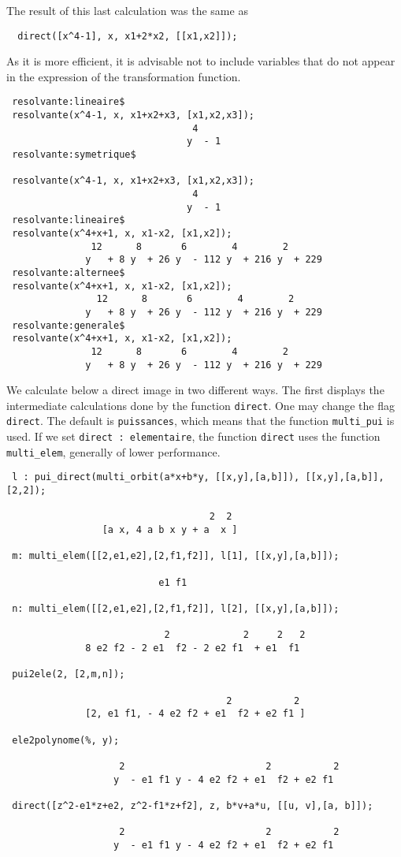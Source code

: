 \documentclass[11pt]{article}
\begin{document}
\normalsize
The result of this last calculation was the same as
\begin{verbatim} 
  direct([x^4-1], x, x1+2*x2, [[x1,x2]]);
\end{verbatim}
As it is more efficient, it is advisable not to include variables that do not
appear in the expression of the transformation function.
\small
\begin{verbatim} 
 resolvante:lineaire$
 resolvante(x^4-1, x, x1+x2+x3, [x1,x2,x3]);
                                 4
                                y  - 1
 resolvante:symetrique$

 resolvante(x^4-1, x, x1+x2+x3, [x1,x2,x3]);
                                 4
                                y  - 1
 resolvante:lineaire$
 resolvante(x^4+x+1, x, x1-x2, [x1,x2]);
               12      8       6        4        2
              y   + 8 y  + 26 y  - 112 y  + 216 y  + 229
 resolvante:alternee$
 resolvante(x^4+x+1, x, x1-x2, [x1,x2]);
                12      8       6        4        2
              y   + 8 y  + 26 y  - 112 y  + 216 y  + 229
 resolvante:generale$
 resolvante(x^4+x+1, x, x1-x2, [x1,x2]);
               12      8       6        4        2
              y   + 8 y  + 26 y  - 112 y  + 216 y  + 229 
\end{verbatim}
\normalsize
We calculate below a direct image in two different ways.  The first displays the
intermediate calculations done by the function \texttt{direct}.  One may change
the flag \texttt{direct}.  The default is \texttt{puissances}, which means that
the function \texttt{multi\_pui} is used.  If we set \texttt{direct :
elementaire}, the function \texttt{direct} uses the function
\texttt{multi\_elem}, generally of lower performance.
\small
\begin{verbatim}
 l : pui_direct(multi_orbit(a*x+b*y, [[x,y],[a,b]]), [[x,y],[a,b]], [2,2]);

                                    2  2
                 [a x, 4 a b x y + a  x ]

 m: multi_elem([[2,e1,e2],[2,f1,f2]], l[1], [[x,y],[a,b]]);

                           e1 f1

 n: multi_elem([[2,e1,e2],[2,f1,f2]], l[2], [[x,y],[a,b]]);

                            2             2     2   2
              8 e2 f2 - 2 e1  f2 - 2 e2 f1  + e1  f1

 pui2ele(2, [2,m,n]);

                                       2           2
              [2, e1 f1, - 4 e2 f2 + e1  f2 + e2 f1 ]
 
 ele2polynome(%, y);

                    2                         2           2
                   y  - e1 f1 y - 4 e2 f2 + e1  f2 + e2 f1

 direct([z^2-e1*z+e2, z^2-f1*z+f2], z, b*v+a*u, [[u, v],[a, b]]);

                    2                         2           2
                   y  - e1 f1 y - 4 e2 f2 + e1  f2 + e2 f1
\end{verbatim}
\end{document}
